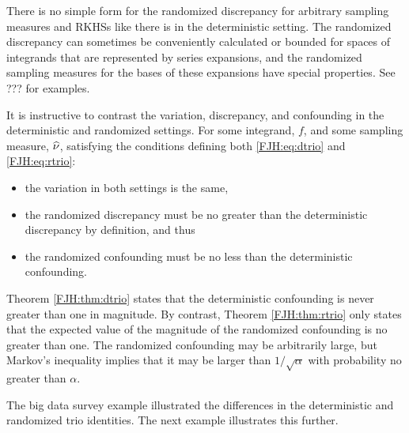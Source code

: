 \documentclass[graybox,footinfo]{svmult}
\begin{document}
There is no simple form for the randomized discrepancy for arbitrary sampling measures 
and RKHSs like there is in the deterministic setting.  The 
randomized discrepancy can sometimes be conveniently calculated or bounded for 
spaces of integrands that are represented by series expansions, and the randomized 
sampling measures for the bases of these expansions have special properties.  See ??? 
for examples.

It is instructive to contrast the variation, discrepancy, and confounding in the 
deterministic and randomized settings.   For some integrand, $f$, and some sampling 
measure, $\widehat{\nu}$, satisfying the 
conditions defining both \eqref{FJH:eq:dtrio}  and \eqref{FJH:eq:rtrio}:
\begin{itemize}
	\item the variation in both settings is the same,
	
	\item the randomized discrepancy 
	must be no greater than the deterministic discrepancy by definition, and thus
	
	\item the randomized confounding must be no less than the deterministic 
	confounding.  
\end{itemize}
Theorem \ref{FJH:thm:dtrio} states that the deterministic confounding is never greater 
than one in magnitude.  By contrast, Theorem \ref{FJH:thm:rtrio} 
only states that the expected value of the magnitude of the randomized confounding is 
no greater than one.  The randomized confounding may be arbitrarily large, but Markov's 
inequality implies that it may be larger than $1/\sqrt{\alpha}$ with  probability no greater 
than $\alpha$.  

The big data survey example illustrated the differences in the 
deterministic and randomized trio identities.  The next example illustrates this further.
\end{document}
